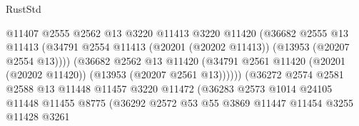 \begin{lexlean}{RustStd}
\begin{coremodule}
                                          @11407
                                          @2555
                                          @2562
                                          @13
                                          @3220
                                          @11413
                                          @3220
                                          @11420
                                          (@36682
                                            @2555
                                            @13
                                            @11413
                                            (@34791
                                              @2554
                                              @11413
                                              (@20201 (@20202 @11413))
                                              (@13953 (@20207 @2554 @13))))
                                          (@36682
                                            @2562
                                            @13
                                            @11420
                                            (@34791
                                              @2561
                                              @11420
                                              (@20201 (@20202 @11420))
                                              (@13953 (@20207 @2561 @13))))))
                                      (@36272
                                        @2574
                                        @2581
                                        @2588
                                        @13
                                        @11448
                                        @11457
                                        @3220
                                        @11472
                                        (@36283
                                          @2573
                                          @1014
                                          @24105
                                          @11448
                                          @11455
                                          @8775
                                          (@36292
                                            @2572
                                            @53
                                            @55
                                            @3869
                                            @11447
                                            @11454
                                            @3255
                                            @11428
                                            @3261

\end{coremodule}
\end{lexlean}
